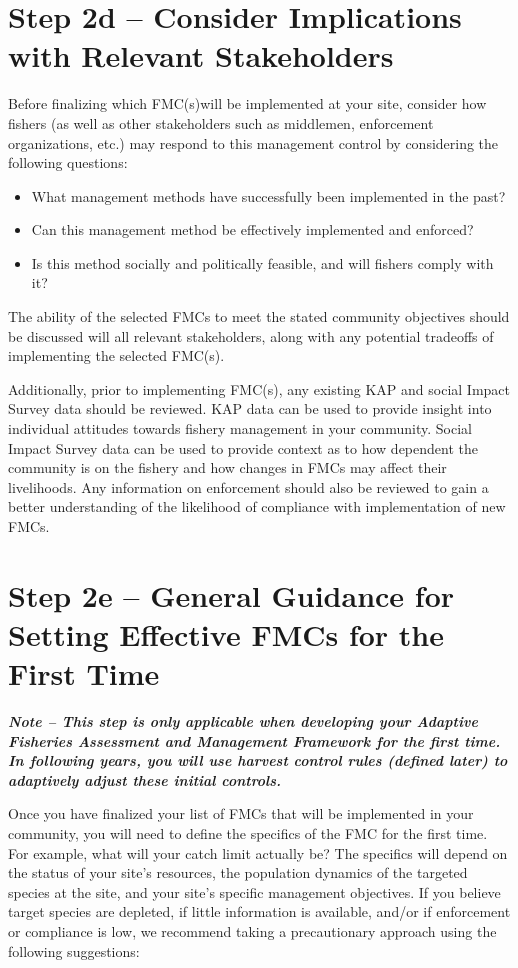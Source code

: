 \documentclass[]{book}
\begin{document}
\hypertarget{Step2d}{\section{Step 2d -- Consider Implications with
Relevant Stakeholders}\label{Step2d}}

Before finalizing which FMC(s)will be implemented at your site, consider
how fishers (as well as other stakeholders such as middlemen,
enforcement organizations, etc.) may respond to this management control
by considering the following questions:

\begin{itemize}
\item
  What management methods have successfully been implemented in the
  past?
\item
  Can this management method be effectively implemented and enforced?
\item
  Is this method socially and politically feasible, and will fishers
  comply with it?
\end{itemize}

The ability of the selected FMCs to meet the stated community objectives
should be discussed will all relevant stakeholders, along with any
potential tradeoffs of implementing the selected FMC(s).

Additionally, prior to implementing FMC(s), any existing KAP and social
Impact Survey data should be reviewed. KAP data can be used to provide
insight into individual attitudes towards fishery management in your
community. Social Impact Survey data can be used to provide context as
to how dependent the community is on the fishery and how changes in FMCs
may affect their livelihoods. Any information on enforcement should also
be reviewed to gain a better understanding of the likelihood of
compliance with implementation of new FMCs.

\section{Step 2e -- General Guidance for Setting Effective FMCs for the
First Time}\label{Step2e}

\textbf{\emph{Note -- This step is only applicable when developing your
Adaptive Fisheries Assessment and Management Framework for the first
time. In following years, you will use harvest control rules (defined
later) to adaptively adjust these initial controls.}}

Once you have finalized your list of FMCs that will be implemented in
your community, you will need to define the specifics of the FMC for the
first time. For example, what will your catch limit actually be? The
specifics will depend on the status of your site's resources, the
population dynamics of the targeted species at the site, and your site's
specific management objectives. If you believe target species are
depleted, if little information is available, and/or if enforcement or
compliance is low, we recommend taking a precautionary approach using
the following suggestions:
\end{document}
